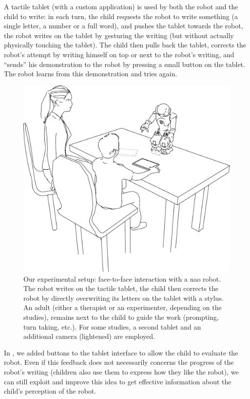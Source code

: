 \documentclass[10pt,a4paper]{article}
\begin{document}
A tactile tablet (with a custom application) is used by both the robot and the
child to write: in each turn, the child requests the robot to write
something (a single letter, a number or a full word), and pushes the tablet
towards the robot, the robot writes on the tablet by gesturing the writing (but
without actually physically touching the tablet). The child then pulls back the
tablet, corrects the robot's attempt by writing himself on top or next to
the robot's writing, and ``sends'' his
demonstration to the robot by pressing a small button on the tablet. The robot
learns from this demonstration and tries again.


   \begin{figure}
       \centering
       \includegraphics[width=0.6\columnwidth]{experimental_setup}
       \caption{\small Our experimental setup: face-to-face interaction with a {\sc
           nao} robot.  The robot writes on the tactile tablet, the child then
           corrects the robot by directly overwriting its letters on the tablet
           with a stylus. An adult (either a therapist or an experimenter,
           depending on the studies), remains next to the child to guide the work
           (prompting, turn taking, etc.). For some studies, a second tablet and an
           additional camera (lightened) are employed.}

       \label{experimental_setup}
   \end{figure}
   
In \cite{jacq2016building}, we added buttons to the tablet interface to allow the child to evaluate the robot. Even if this feedback does not necessarily concerns the progress of the robot's writing (children also use them to express how they like the robot), we can still exploit and improve this idea to get effective information about the child's perception of the robot.
   
\end{document}
